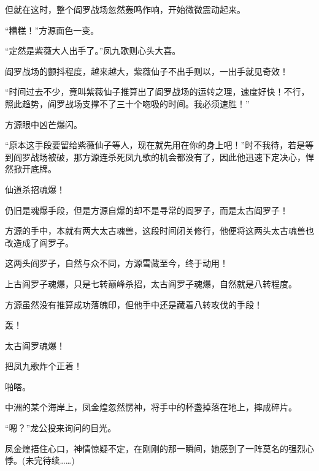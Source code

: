 \begin{this_body}
但就在这时，整个阎罗战场忽然轰鸣作响，开始微微震动起来。

“糟糕！”方源面色一变。

“定然是紫薇大人出手了。”凤九歌则心头大喜。

阎罗战场的颤抖程度，越来越大，紫薇仙子不出手则以，一出手就见奇效！

“时间过去不少，竟叫紫薇仙子推算出了阎罗战场的运转之理，速度好快！不行，照此趋势，阎罗战场支撑不了三十个唿吸的时间。我必须速胜！”

方源眼中凶芒爆闪。

“原本这手段要留给紫薇仙子等人，现在就先用在你的身上吧！”时不我待，若是等到阎罗战场被破，那方源连杀死凤九歌的机会都没有了，因此他迅速下定决心，悍然掀开底牌。

仙道杀招魂爆！

仍旧是魂爆手段，但是方源自爆的却不是寻常的阎罗子，而是太古阎罗子！

方源的手中，本就有两大太古魂兽，这段时间闭关修行，他便将这两头太古魂兽也改造成了阎罗子。

这两头阎罗子，自然与众不同，方源雪藏至今，终于动用！

上古阎罗子魂爆，只是七转巅峰杀招，太古阎罗子魂爆，自然就是八转程度。

方源虽然没有推算成功落魄印，但他手中还是藏着八转攻伐的手段！

轰！

太古阎罗魂爆！

把凤九歌炸个正着！

啪嗒。

中洲的某个海岸上，凤金煌忽然愣神，将手中的杯盏掉落在地上，摔成碎片。

“嗯？”龙公投来询问的目光。

凤金煌捂住心口，神情惊疑不定，在刚刚的那一瞬间，她感到了一阵莫名的强烈心悸。(未完待续……)

\end{this_body}

